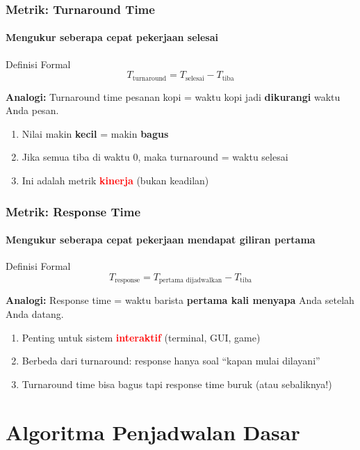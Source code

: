 \documentclass[t,aspectratio=169,xcolor=dvipsnames]{beamer}
\newcommand{\tem}[1]{\textbf{\textcolor{red}{#1}}}
\begin{document}
\begin{frame}
    \frametitle{Metrik: Turnaround Time}
    \framesubtitle{Mengukur seberapa cepat pekerjaan selesai}
    \small
    \begin{block}{Definisi Formal}
        $$T_{\text{turnaround}} = T_{\text{selesai}} - T_{\text{tiba}}$$
    \end{block}
    \vspace{0.2cm}
    \textbf{Analogi:} Turnaround time pesanan kopi = waktu kopi jadi \textbf{dikurangi} waktu Anda pesan.

    \vspace{0.2cm}
    \begin{enumerate}
        \item Nilai makin \textbf{kecil} = makin \textbf{bagus}
        \item Jika semua tiba di waktu 0, maka turnaround = waktu selesai
        \item Ini adalah metrik \tem{kinerja} (bukan keadilan)
    \end{enumerate}
\end{frame}

\begin{frame}
    \frametitle{Metrik: Response Time}
    \framesubtitle{Mengukur seberapa cepat pekerjaan mendapat giliran pertama}
    \small
    \begin{block}{Definisi Formal}
        $$T_{\text{response}} = T_{\text{pertama\ dijadwalkan}} - T_{\text{tiba}}$$
    \end{block}
    \vspace{0.2cm}
    \textbf{Analogi:} Response time = waktu barista \textbf{pertama kali menyapa} Anda setelah Anda datang.

    \vspace{0.2cm}
    \begin{enumerate}
        \item Penting untuk sistem \tem{interaktif} (terminal, GUI, game)
        \item Berbeda dari turnaround: response hanya soal ``kapan mulai dilayani''
        \item Turnaround time bisa bagus tapi response time buruk (atau sebaliknya!)
    \end{enumerate}
\end{frame}

\section{Algoritma Penjadwalan Dasar}
\end{document}
